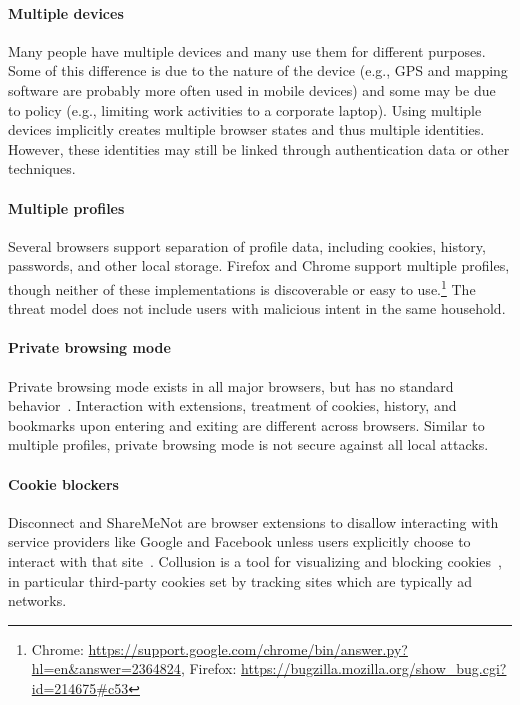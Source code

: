 \documentclass[10pt, conference, compsocconf]{IEEEtran}
\begin{document}
\paragraph{Multiple devices}

Many people have multiple devices and many use them for different purposes.
Some of this difference is due to the nature of the device (e.g.,
GPS and mapping software are probably more often used in mobile devices) and
some may be due to policy (e.g., limiting work activities to a corporate
laptop). Using multiple devices implicitly creates multiple browser states and
thus multiple identities.  However, these identities may still be linked
through authentication data or other techniques.%

\paragraph{Multiple profiles}

Several browsers support separation of profile data, including cookies,
history, passwords, and other local storage. Firefox 
and Chrome support multiple profiles, though neither of these implementations
is discoverable or easy to use.\footnote{Chrome:
\url{https://support.google.com/chrome/bin/answer.py?hl=en&answer=2364824},
Firefox: \url{https://bugzilla.mozilla.org/show\_bug.cgi?id=214675\#c53}} The
threat model does not include users with malicious intent in the same
household.

\paragraph{Private browsing mode}
Private browsing mode exists in all major browsers, but has no standard
behavior~\cite{ABBJ10}.
Interaction with extensions, treatment of cookies, history, and
bookmarks upon entering and exiting are different across browsers.
Similar to multiple profiles, private browsing mode is not secure
against all local attacks.

\paragraph{Cookie blockers}
Disconnect and ShareMeNot are browser extensions to disallow interacting with
service providers like Google and Facebook unless users explicitly choose to
interact with that site~\cite{disconnect,franzi}.  Collusion is a tool for
visualizing and blocking cookies~\cite{collusion}, in particular third-party
cookies set by tracking sites which are typically ad networks.
\end{document}
